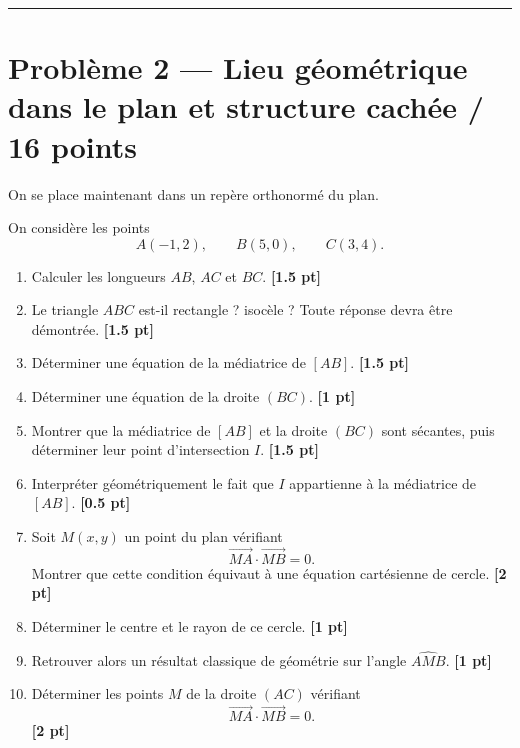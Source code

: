 \documentclass[11pt,a4paper]{article}
\newcommand{\vv}[1]{\overrightarrow{#1}}
\newcommand{\barq}[1]{\hfill{\small\textbf{[#1 pt]}}}
\begin{document}
\vspace{1em}
\hrule
\vspace{1em}

\section*{Problème 2 --- Lieu géométrique dans le plan et structure cachée \hfill / 16 points}

On se place maintenant dans un repère orthonormé du plan.

On considère les points
\[
A(-1,2),\qquad B(5,0),\qquad C(3,4).
\]

\begin{enumerate}[label=\textbf{\arabic*.}]
    \item Calculer les longueurs \(AB\), \(AC\) et \(BC\). \barq{1.5}

    \item Le triangle \(ABC\) est-il rectangle ? isocèle ?  
    Toute réponse devra être démontrée. \barq{1.5}

    \item Déterminer une équation de la médiatrice de \([AB]\). \barq{1.5}

    \item Déterminer une équation de la droite \((BC)\). \barq{1}

    \item Montrer que la médiatrice de \([AB]\) et la droite \((BC)\) sont sécantes, puis déterminer leur point d'intersection \(I\). \barq{1.5}

    \item Interpréter géométriquement le fait que \(I\) appartienne à la médiatrice de \([AB]\). \barq{0.5}

    \item Soit \(M(x,y)\) un point du plan vérifiant
    \[
    \vv{MA}\cdot\vv{MB}=0.
    \]
    Montrer que cette condition équivaut à une équation cartésienne de cercle. \barq{2}

    \item Déterminer le centre et le rayon de ce cercle. \barq{1}

    \item Retrouver alors un résultat classique de géométrie sur l'angle \(\widehat{AMB}\). \barq{1}

    \item Déterminer les points \(M\) de la droite \((AC)\) vérifiant
    \[
    \vv{MA}\cdot\vv{MB}=0.
    \]
    \barq{2}


\end{enumerate}
\end{document}
